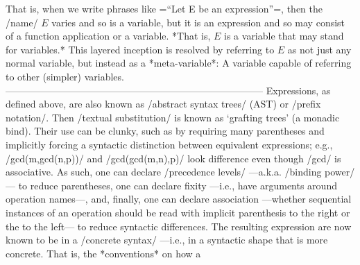 \documentclass[11pt]{article}
\begin{document}
 That is, when we write phrases like =“Let E be an expression”=, then the /name/ $E$ varies and so is a variable, but it is an expression and so may consist of a function application or a variable. *That is, $E$ is a variable that may stand for variables.* This layered inception is resolved by referring to $E$ as not just any normal variable, but instead as a *meta-variable*: A variable capable of referring to other (simpler) variables.  --------------------------------------------------------------------------------  Expressions, as defined above, are also known as /abstract syntax trees/ (AST) or /prefix notation/. Then /textual substitution/ is known as ‘grafting trees’ (a monadic bind).  Their use can be clunky, such as by requiring many parentheses and implicitly forcing a syntactic distinction between equivalent expressions; e.g., /gcd(m,gcd(n,p))/ and /gcd(gcd(m,n),p)/ look difference even though /gcd/ is associative.  As such, one can declare /precedence levels/ ---a.k.a. /binding power/--- to reduce parentheses, one can declare fixity ---i.e., have arguments around operation names---, and, finally, one can declare association ---whether sequential instances of an operation should be read with implicit parenthesis to the right or the to the left--- to reduce syntactic differences. \quad The resulting expression are now known to be in a /concrete syntax/ ---i.e., in a syntactic shape that is more concrete.  That is, the *conventions* on how a 
\end{document}
